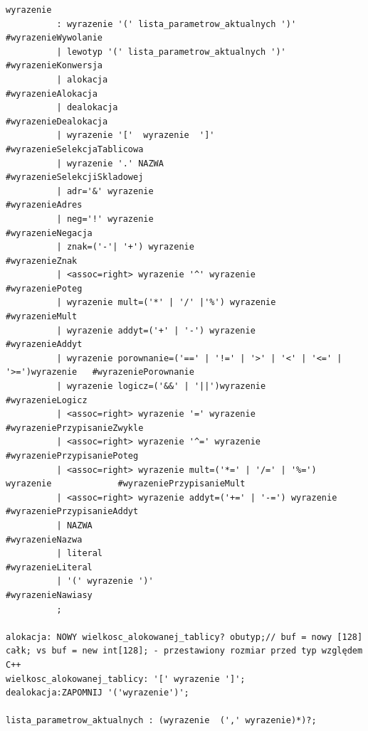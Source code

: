 \begin{lstlisting}[basicstyle=\scriptsize\ttfamily,breaklines=true]
wyrazenie
          : wyrazenie '(' lista_parametrow_aktualnych ')'                           #wyrazenieWywolanie
          | lewotyp '(' lista_parametrow_aktualnych ')'                             #wyrazenieKonwersja
          | alokacja                                                                #wyrazenieAlokacja
          | dealokacja                                                              #wyrazenieDealokacja
          | wyrazenie '['  wyrazenie  ']'                                           #wyrazenieSelekcjaTablicowa
          | wyrazenie '.' NAZWA                                                     #wyrazenieSelekcjiSkladowej
          | adr='&' wyrazenie                                                       #wyrazenieAdres
          | neg='!' wyrazenie                                                       #wyrazenieNegacja
          | znak=('-'| '+') wyrazenie                                               #wyrazenieZnak
          | <assoc=right> wyrazenie '^' wyrazenie                                   #wyrazeniePoteg
          | wyrazenie mult=('*' | '/' |'%') wyrazenie                               #wyrazenieMult
          | wyrazenie addyt=('+' | '-') wyrazenie                                   #wyrazenieAddyt
          | wyrazenie porownanie=('==' | '!=' | '>' | '<' | '<=' | '>=')wyrazenie   #wyrazeniePorownanie
          | wyrazenie logicz=('&&' | '||')wyrazenie                                 #wyrazenieLogicz
          | <assoc=right> wyrazenie '=' wyrazenie                                   #wyrazeniePrzypisanieZwykle
          | <assoc=right> wyrazenie '^=' wyrazenie                                  #wyrazeniePrzypisaniePoteg
          | <assoc=right> wyrazenie mult=('*=' | '/=' | '%=') wyrazenie             #wyrazeniePrzypisanieMult
          | <assoc=right> wyrazenie addyt=('+=' | '-=') wyrazenie                   #wyrazeniePrzypisanieAddyt
          | NAZWA                                                                   #wyrazenieNazwa
          | literal                                                                 #wyrazenieLiteral
          | '(' wyrazenie ')'                                                       #wyrazenieNawiasy
          ;

alokacja: NOWY wielkosc_alokowanej_tablicy? obutyp;// buf = nowy [128] całk; vs buf = new int[128]; - przestawiony rozmiar przed typ względem C++
wielkosc_alokowanej_tablicy: '[' wyrazenie ']';
dealokacja:ZAPOMNIJ '('wyrazenie')';

lista_parametrow_aktualnych : (wyrazenie  (',' wyrazenie)*)?;


\end{lstlisting}
